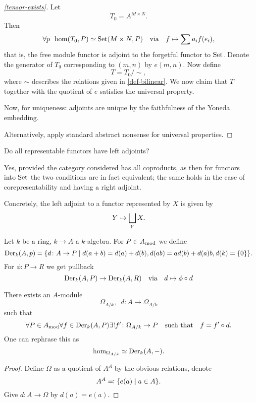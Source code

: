 \begin{proof}[\cref{tensor-exists}]
  Let
  \[ T_0 = A^{M \times N}.\]
  Then
  \[ \forall p \enspace \hom(T_0, P) \simeq \text{Set}(M \times N, P) \quad \text{via} \quad  f \mapsto \sum a_i f(e_i) ,\]
  that is, the free module functor is adjoint to the forgetful functor to $\text{Set}$.
  Denote the generator of $T_0$ corresponding to $(m, n)$ by $e(m, n)$. Now define
  \[ T = T_0 / {\sim}, \]
  where $\sim$ describes the relations given in \cref{def-bilinear}.
  We now claim that $T$ together with the quotient of $e$ satisfies the universal property.


  Now, for uniqueness: adjoints are unique by the faithfulness of the Yoneda embedding.

  Alternatively, apply standard abstract nonsense for universal properties.
\end{proof}

\begin{question}
  Do all representable functors have left adjoints?
\end{question}
\begin{answer}
  Yes, provided the category considered has all coproducts, as then for functors into $\text{Set}$ the two conditions are in fact equivalent; the same holds in the case of corepresentability and having a right adjoint.

  Concretely, the left adjoint to a functor represented by $X$ is given by
  \[ Y \mapsto \bigsqcup_Y X.\] 
\end{answer}

\begin{df}
  Let $k$ be a ring,  $k \to A$ a $k$-algebra. For $P \in A_\text{mod}$ we define
  \[ \operatorname{Der}_k(A, p) = \{ d \colon A \to P \mathrel{|} d(a+b) = d(a) + d(b), d(ab) = a d(b) + d(a) b, d(k) = \{0\} \}.\]
  For $\phi \colon P \to R$ we get pullback
  \[ \operatorname{Der}_k(A, P) \to \operatorname{Der}_k(A, R) \quad \text{via} \quad d \mapsto \phi \circ d\]
\end{df}

\begin{theorem}
  There exists an $A$-module
  \[ \Omega_{A / {k}}, \enspace d \colon A \to \Omega_{A /{k}}\]
  such that
  \[ \forall P \in A_\text{mod} \forall f \in \operatorname{Der}_k(A, P) \exists \text{!} f' \colon \Omega_{A /{k}} \to P \quad \text{such that} \quad f = f' \circ d.\]
  One can rephrase this as
  \[ \hom_{\Omega_{A/{k}}} \simeq \operatorname{Der}_k(A, -).\]
\end{theorem}
\begin{proof}
  Define $\Omega$ as a quotient of $A^A$ by the obvious relations, denote
  \[ A^A \eqqcolon \{e(a) \mathrel{|} a \in A \}.\]
  Give $d \colon A \to \Omega$ by $d(a) = e(a)$.
\end{proof}

